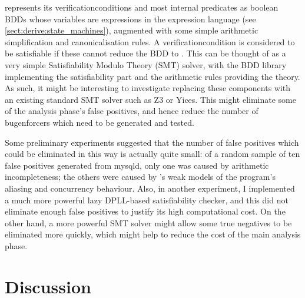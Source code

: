 {\Technique} represents its \glspl{verificationcondition} and most
internal predicates as boolean BDDs whose variables are expressions in
the {\StateMachine} expression language (see
\autoref{sect:derive:state_machines}), augmented with some simple
arithmetic simplification and canonicalisation rules.  A
\gls{verificationcondition} is considered to be satisfiable if these
cannot reduce the BDD to \false.  This can be thought of as a very
simple Satisfiability Modulo Theory (SMT) solver\cite{Barrett2009},
with the BDD library implementing the satisfiability part and the
arithmetic rules providing the theory.  As such, it might be
interesting to investigate replacing these components with an existing
standard SMT solver such as Z3\cite{Moura2008} or
Yices\cite{Dutertre2006}.  This might eliminate some of the analysis
phase's false positives, and hence reduce the number of
\glspl{bugenforcer} which need to be generated and tested.

Some preliminary experiments suggested that the number of false
positives which could be eliminated in this way is actually quite
small: of a random sample of ten false positives generated from
mysqld, only one was caused by arithmetic incompleteness; the others
were caused by {\technique}'s weak models of the program's aliasing
and concurrency behaviour.  Also, in another experiment, I implemented
a much more powerful lazy DPLL-based satisfiability
checker\cite{Davis1962}, and this did not eliminate enough false
positives to justify its high computational cost.  On the other hand,
a more powerful SMT solver might allow some true negatives to be
eliminated more quickly, which might help to reduce the cost of the
main analysis phase.

\section{Discussion}
